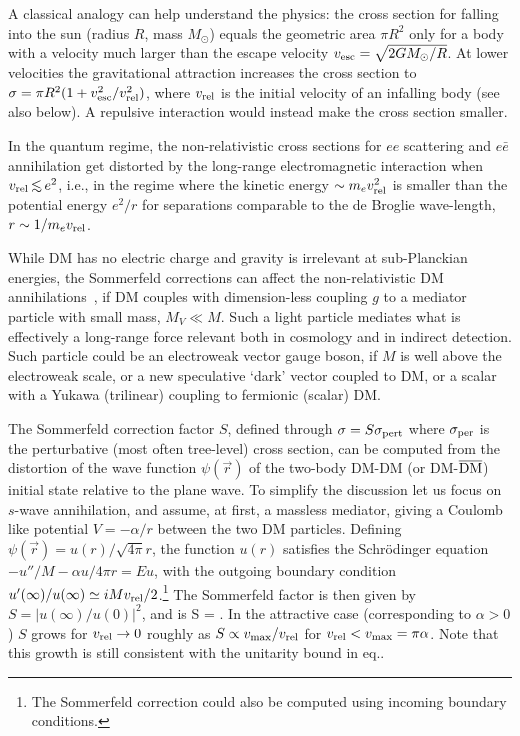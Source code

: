 \medskip 

A classical analogy can help understand the physics: 
the cross section for falling into the sun (radius $R$, mass $M_\odot$)
equals the geometric area $\pi R^2$ only
for a body with a velocity much larger than the escape velocity
$v_{\rm esc} = \sqrt{2GM_\odot/R}$.
At lower  velocities the gravitational attraction increases the cross section to
$\sigma =\pi R^2 (1+ v_{\rm esc}^2/v^2_{\rm rel})$, 
where $v_{\rm rel}$ is the initial velocity of an infalling body (see also below).
A repulsive interaction would instead make the cross section smaller.

In the quantum regime, the non-relativistic cross sections for $e e$ scattering and $e \bar{e}$ annihilation
get distorted by the long-range electromagnetic interaction
when $v_{\rm rel} \circa{<} e^2$, i.e., in the regime where
the kinetic energy $\sim m_e v^2_{\rm rel}$ is smaller than the potential energy $e^2/r$ for separations
 comparable to the de Broglie wave-length, $r\sim 1/m_e v_{\rm rel}$.

\medskip

While DM has no electric charge and gravity is irrelevant at sub-Planckian energies,  
the Sommerfeld corrections can affect the non-relativistic DM annihilations~\cite{Sommerfeld}, if DM couples with dimension-less coupling $g$ to
a mediator particle with small mass, $M_V \ll M$. Such a light particle mediates what is effectively a long-range force relevant both in cosmology and in indirect detection. 
Such particle could be an electroweak vector gauge boson, if $M$ is well above the electroweak scale, or a new speculative `dark' vector coupled to DM, or a scalar
with a Yukawa (trilinear) coupling to fermionic (scalar) DM.


The Sommerfeld correction factor $S$, defined through $\sigma = S \sigma_{\rm pert}$ where $\sigma_{\rm per}$ is the perturbative (most often tree-level) cross section,
can be computed from the distortion of the wave function $\psi(\vec r)$
of the two-body DM-DM (or DM-$\overline{\rm DM}$)  initial state relative to the plane wave. To simplify the discussion let us focus on $s$-wave annihilation, and assume, at first, a massless mediator, giving a Coulomb like potential $V=-\alpha/r$ between the two DM particles.
Defining $\psi(\vec r) = u(r)/\sqrt{4\pi} r$, the function $u(r)$ satisfies  the  Schr\" odinger equation
$- u''/M - \alpha u/4\pi r  = E u$, with the outgoing boundary condition $u'(\infty)/u(\infty) \simeq iM v_{\rm rel}/2$.\footnote{The Sommerfeld correction could also be computed using incoming boundary conditions.}
The Sommerfeld factor  is then given by
$S = |u(\infty)/u(0)|^2$, and is
\beq  \label{eq:S0}
S = .\eeq
In the attractive case (corresponding to $\alpha >0$) $S$ grows for $ v_{\rm rel}\to 0$  roughly as $ S\propto v_{\rm max}/ v_{\rm rel}$ for  $ v_{\rm rel} <v_{\rm max} =\pi\alpha$. Note that this growth is still
consistent with the unitarity bound in eq..

